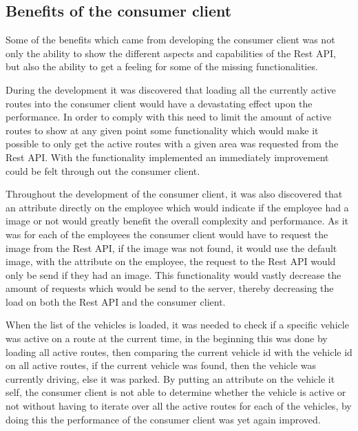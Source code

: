 \subsection{Benefits of the consumer client}\label{ssec:benefits_consumer_client}
Some of the benefits which came from developing the consumer client was not only the ability to show the different aspects and capabilities of the Rest API, but also the ability to get a feeling for some of the missing functionalities.

\bigskip
{}
During the development it was discovered that loading all the currently active routes into the consumer client would have a devastating effect upon the performance.
In order to comply with this need to limit the amount of active routes to show at any given point some functionality which would make it possible to only get the active routes with a given area was requested from the Rest API.
With the functionality implemented an immediately improvement could be felt through out the consumer client.

\bigskip
{}
Throughout the development of the consumer client, it was also discovered that an attribute directly on the employee which would indicate if the employee had a image or not would greatly benefit the overall  complexity and performance.
As it was for each of the employees the consumer client would have to request the image from the Rest API, if the image was not found, it would use the default image, with the attribute on the employee, the request to the Rest API would only be send if they had an image.
This functionality would vastly decrease the amount of requests which would be send to the server, thereby decreasing the load on both the Rest API and the consumer client.

\bigskip
{}
When the list of the vehicles is loaded, it was needed to check if a specific vehicle was active on a route at the current time, in the beginning this was done by loading all active routes, then comparing the current vehicle id with the vehicle id on all active routes, if the current vehicle was found, then the vehicle was currently driving, else it was parked.
By putting an attribute on the vehicle it self, the consumer client is not able to determine whether the vehicle is active or not without having to iterate over all the active routes for each of the vehicles, by doing this the performance of the consumer client was yet again improved.

